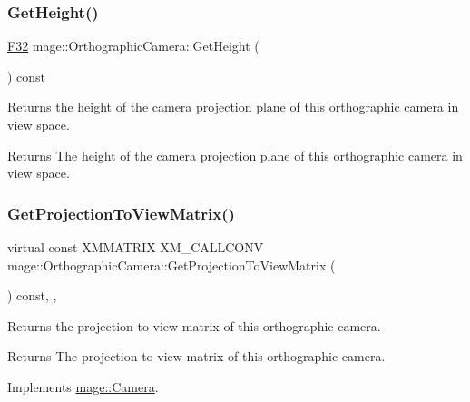 \subsubsection{\texorpdfstring{Get\+Height()}{GetHeight()}}
{\footnotesize\ttfamily \hyperlink{namespacemage_aa97e833b45f06d60a0a9c4fc22ae02c0}{F32} mage\+::\+Orthographic\+Camera\+::\+Get\+Height (\begin{DoxyParamCaption}{ }\end{DoxyParamCaption}) const\hspace{0.3cm}{\ttfamily [noexcept]}}

Returns the height of the camera projection plane of this orthographic camera in view space.

\begin{DoxyReturn}{Returns}
The height of the camera projection plane of this orthographic camera in view space. 
\end{DoxyReturn}
\hypertarget{classmage_1_1_orthographic_camera_a7bbc235a85877c12b60d1a56d5b65108}{}\label{classmage_1_1_orthographic_camera_a7bbc235a85877c12b60d1a56d5b65108} 
\subsubsection{\texorpdfstring{Get\+Projection\+To\+View\+Matrix()}{GetProjectionToViewMatrix()}}
{\footnotesize\ttfamily virtual const X\+M\+M\+A\+T\+R\+IX X\+M\+\_\+\+C\+A\+L\+L\+C\+O\+NV mage\+::\+Orthographic\+Camera\+::\+Get\+Projection\+To\+View\+Matrix (\begin{DoxyParamCaption}{ }\end{DoxyParamCaption}) const\hspace{0.3cm}{\ttfamily [override]}, {\ttfamily [virtual]}, {\ttfamily [noexcept]}}

Returns the projection-\/to-\/view matrix of this orthographic camera.

\begin{DoxyReturn}{Returns}
The projection-\/to-\/view matrix of this orthographic camera. 
\end{DoxyReturn}


Implements \hyperlink{classmage_1_1_camera_a9259dee9eeee754a1392cca88f428d29}{mage\+::\+Camera}.

